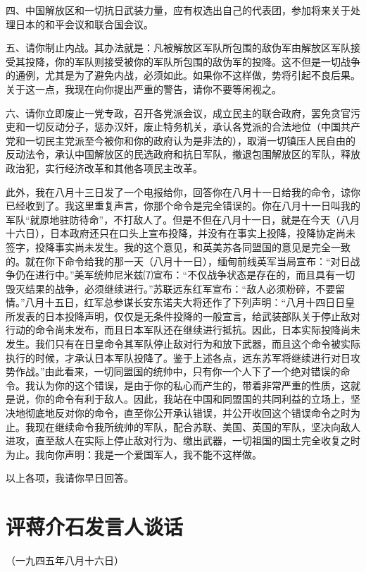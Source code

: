 \documentclass[UTF-8, a5paper, 12pt]{ctexart}
\begin{document}
四、中国解放区和一切抗日武装力量，应有权选出自己的代表团，参加将来关于处理日本的和平会议和联合国会议。

五、请你制止内战。其办法就是：凡被解放区军队所包围的敌伪军由解放区军队接受其投降，你的军队则接受被你的军队所包围的敌伪军的投降。这不但是一切战争的通例，尤其是为了避免内战，必须如此。如果你不这样做，势将引起不良后果。关于这一点，我现在向你提出严重的警告，请你不要等闲视之。

六、请你立即废止一党专政，召开各党派会议，成立民主的联合政府，罢免贪官污吏和一切反动分子，惩办汉奸，废止特务机关，承认各党派的合法地位（中国共产党和一切民主党派至今被你和你的政府认为是非法的），取消一切镇压人民自由的反动法令，承认中国解放区的民选政府和抗日军队，撤退包围解放区的军队，释放政治犯，实行经济改革和其他各项民主改革。

此外，我在八月十三日发了一个电报给你，回答你在八月十一日给我的命令，谅你已经收到了。我这里重复声言，你那个命令是完全错误的。你在八月十一日叫我的军队“就原地驻防待命”，不打敌人了。但是不但在八月十一日，就是在今天（八月十六日），日本政府还只在口头上宣布投降，并没有在事实上投降，投降协定尚未签字，投降事实尚未发生。我的这个意见，和英美苏各同盟国的意见是完全一致的。就在你下命令给我的那一天（八月十一日），缅甸前线英军当局宣布：“对日战争仍在进行中。”美军统帅尼米兹⑺宣布：“不仅战争状态是存在的，而且具有一切毁灭结果的战争，必须继续进行。”苏联远东红军宣布：“敌人必须粉碎，不要留情。”八月十五日，红军总参谋长安东诺夫大将还作了下列声明：“八月十四日日皇所发表的日本投降声明，仅仅是无条件投降的一般宣言，给武装部队关于停止敌对行动的命令尚未发布，而且日本军队还在继续进行抵抗。因此，日本实际投降尚未发生。我们只有在日皇命令其军队停止敌对行为和放下武器，而且这个命令被实际执行的时候，才承认日本军队投降了。鉴于上述各点，远东苏军将继续进行对日攻势作战。”由此看来，一切同盟国的统帅中，只有你一个人下了一个绝对错误的命令。我认为你的这个错误，是由于你的私心而产生的，带着非常严重的性质，这就是说，你的命令有利于敌人。因此，我站在中国和同盟国的共同利益的立场上，坚决地彻底地反对你的命令，直至你公开承认错误，并公开收回这个错误命令之时为止。我现在继续命令我所统帅的军队，配合苏联、美国、英国的军队，坚决向敌人进攻，直至敌人在实际上停止敌对行为、缴出武器，一切祖国的国土完全收复之时为止。我向你声明：我是一个爱国军人，我不能不这样做。

以上各项，我请你早日回答。

\section{评蒋介石发言人谈话}

（一九四五年八月十六日）
\end{document}
